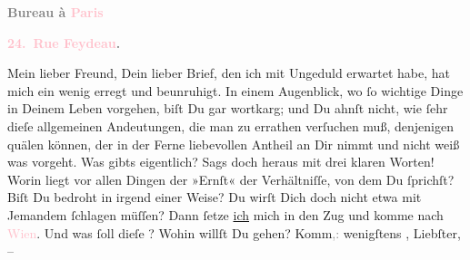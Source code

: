            \pstart
           \begin{otherlanguage}{french}\textcolor{gray}{\textbf{\textbf{Bureau à \textcolor{pink}{Paris}{}\ledrightnote{\textcolor{pink}{Paris}}}}}\end{otherlanguage}\pend
           \pstart
           \begin{otherlanguage}{french}\textcolor{gray}{\textbf{\textbf{\textcolor{pink}{24. Rue Feydeau}{}\ledrightnote{\textcolor{pink}{rue Feydeau}}.}}}\end{otherlanguage}\pend
           \pstart\center{}Mein lieber Freund,\pend\pstart
           Dein lieber Brief, den ich mit Ungeduld \strikeout{\textcolor{gray}{e}\textcolor{gray}{×}} erwartet habe, hat mich ein wenig erregt und beunruhigt. In einem Augenblick,
               wo ſo wichtige Dinge in Deinem Leben vorgehen, biſt Du gar wortkarg; und Du ahnſt
               nicht, wie ſehr dieſe allgemeinen Andeutungen, die man zu errathen verſuchen muß,
               denjenigen quälen können, der in der Ferne liebevollen Antheil an Dir nimmt und nicht
               weiß was vorgeht. Was gibts eigentlich? Sags doch heraus mit drei klaren Worten!
               Worin liegt vor allen Dingen der »Ernſt« {\pb}der
               Verhältniſſe, von dem Du ſprichſt? Biſt Du bedroht in irgend einer Weise? Du wirſt
               Dich doch nicht etwa mit Jemandem ſchlagen müſſen? Dann ſetze \uline{ich} mich in den Zug und komme nach \textcolor{pink}{Wien}{}\ledrightnote{\textcolor{pink}{Wien}}. Und was ſoll dieſe \label{K_L02802-1v}\label{K_L02802-1h}? Wohin willſt Du gehen? Komm\textcolor{gray}{,:}
               wenigſtens \label{K_L02802-4v}\label{K_L02802-4h}, Liebſter, –
